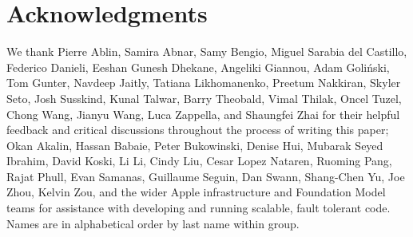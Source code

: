 \section*{Acknowledgments}

We thank
Pierre Ablin,
Samira Abnar,
Samy Bengio,
Miguel Sarabia del Castillo,
Federico Danieli,
Eeshan Gunesh Dhekane,
Angeliki Giannou,
Adam Goli\'nski,
Tom Gunter,
Navdeep Jaitly,
Tatiana Likhomanenko,
Preetum Nakkiran,
Skyler Seto,
Josh Susskind,
Kunal Talwar,
Barry Theobald,
Vimal Thilak,
Oncel Tuzel,
Chong Wang,
Jianyu Wang,
Luca Zappella, and
Shaungfei Zhai
for their helpful feedback and critical discussions throughout the process of writing this paper;
Okan Akalin,
Hassan Babaie, 
Peter Bukowinski,
Denise Hui,
Mubarak Seyed Ibrahim, 
David Koski,
Li Li, 
Cindy Liu,
Cesar Lopez Nataren,
Ruoming Pang,
Rajat Phull,
Evan Samanas, 
Guillaume Seguin, 
Dan Swann,
Shang-Chen Yu,
Joe Zhou,
Kelvin Zou,
and the wider Apple infrastructure
and Foundation Model teams for assistance with developing and running scalable, fault tolerant code.
Names are in alphabetical order by last name within group.

